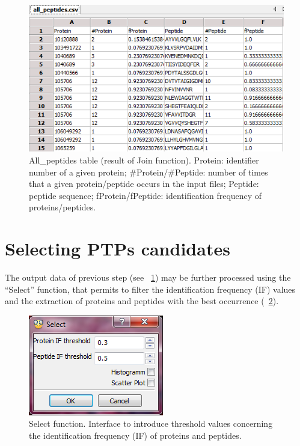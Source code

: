 \documentclass[a4paper,14pt]{extarticle}
\begin{document}
\begin{figure}[ht]
\begin{center}
\includegraphics[scale=0.8]{Eppi_all_peptides}
\caption{All\_peptides table (result of Join function). Protein: identifier number of a given protein; \#Protein/\#Peptide: number of times that a given protein/peptide occurs in the input files; Peptide: peptide sequence; fProtein/fPeptide: identification frequency of proteins/peptides.}\label{fig:allp}
\end{center}
\end{figure}

\section{Selecting PTPs candidates}
The output data of previous step (see \figurename~\ref{fig:allp}) may be further processed using the “Select” function, that permits to filter the identification frequency (IF) values and the extraction of proteins and peptides with the best occurrence (\figurename~\ref{fig:select}).
 

 
\begin{figure}[ht]
\begin{center}
\includegraphics[scale=0.8]{EPPI_select.png}	
\caption{Select function. Interface to introduce threshold values concerning the identification frequency (IF) of proteins and peptides.}\label{fig:select}
\end{center}
\end{figure}
\end{document}
